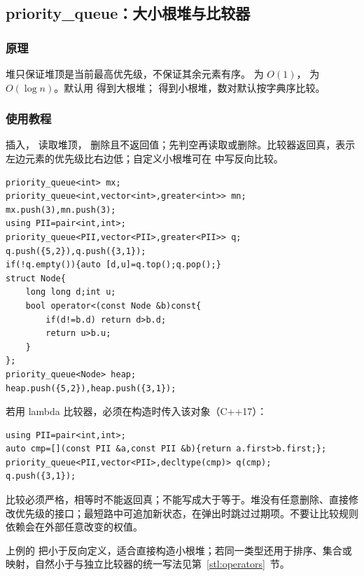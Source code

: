 \subsection{priority\_queue：大小根堆与比较器}
\label{stl:heap}
\subsubsection*{原理}
堆只保证堆顶是当前最高优先级，不保证其余元素有序。 为 $O(1)$， 为 $O(\log n)$。默认用  得到大根堆； 得到小根堆，数对默认按字典序比较。
\subsubsection*{使用教程}
 插入， 读取堆顶， 删除且不返回值；先判空再读取或删除。比较器返回真，表示左边元素的优先级比右边低；自定义小根堆可在  中写反向比较。
\begin{lstlisting}[style=mtycpp,numbers=none]
priority_queue<int> mx;
priority_queue<int,vector<int>,greater<int>> mn;
mx.push(3),mn.push(3);
using PII=pair<int,int>;
priority_queue<PII,vector<PII>,greater<PII>> q;
q.push({5,2}),q.push({3,1});
if(!q.empty()){auto [d,u]=q.top();q.pop();}
struct Node{
	long long d;int u;
	bool operator<(const Node &b)const{
		if(d!=b.d) return d>b.d;
		return u>b.u;
	}
};
priority_queue<Node> heap;
heap.push({5,2}),heap.push({3,1});
\end{lstlisting}
若用 lambda 比较器，必须在构造时传入该对象（C++17）：
\begin{lstlisting}[style=mtycpp,numbers=none]
using PII=pair<int,int>;
auto cmp=[](const PII &a,const PII &b){return a.first>b.first;};
priority_queue<PII,vector<PII>,decltype(cmp)> q(cmp);
q.push({3,1});
\end{lstlisting}
比较必须严格，相等时不能返回真；不能写成大于等于。堆没有任意删除、直接修改优先级的接口；最短路中可追加新状态，在弹出时跳过过期项。不要让比较规则依赖会在外部任意改变的权值。

上例的  把小于反向定义，适合直接构造小根堆；若同一类型还用于排序、集合或映射，自然小于与独立比较器的统一写法见第~\ref{stl:operators}~节。
